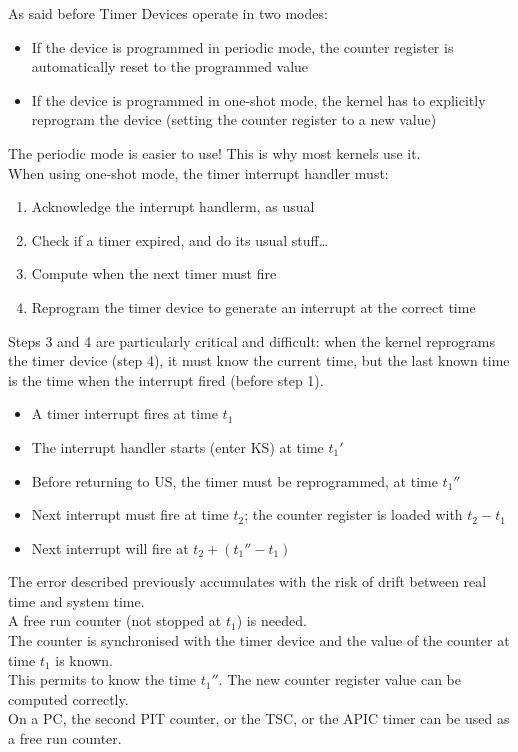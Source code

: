 As said before Timer Devices operate in two modes:
\begin{itemize}
    \item If the device is programmed in periodic mode, the counter register is automatically reset to the programmed value
    \item If the device is programmed in one-shot mode, the kernel has to explicitly reprogram the device (setting the counter register to a new value)
\end{itemize}

The periodic mode is easier to use! This is why most kernels use it.\\
When using one-shot mode, the timer interrupt handler must:
\begin{enumerate}
    \item Acknowledge the interrupt handlerm, as usual
    \item Check if a timer expired, and do its usual stuff\dots
    \item Compute when the next timer must fire
    \item Reprogram the timer device to generate an interrupt at the correct time
\end{enumerate}
Steps 3 and 4 are particularly critical and difficult: when the kernel reprograms the timer device (step 4), it must know the current time, but the last known time is the time when the interrupt fired (before step 1).

\begin{itemize}
    \item A timer interrupt fires at time $t_1$
    \item The interrupt handler starts (enter KS) at time $t_1'$
    \item Before returning to US, the timer must be reprogrammed, at time $t_1''$
    \item Next interrupt must fire at time $t_2$; the counter register is loaded with $t_2 - t_1$
    \item Next interrupt will fire at $t_2 + (t_1'' - t_1)$
\end{itemize}
The error described previously accumulates with the risk of drift between real time and system time.\\
A free run counter (not stopped at $t_1$) is needed.\\
The counter is synchronised with the timer device and the value of the counter at time $t_1$ is known.\\
This permits to know the time $t_1''$. The new counter register value can be computed correctly.\\
On a PC, the second PIT counter, or the TSC, or the APIC timer can be used as a free run counter.

